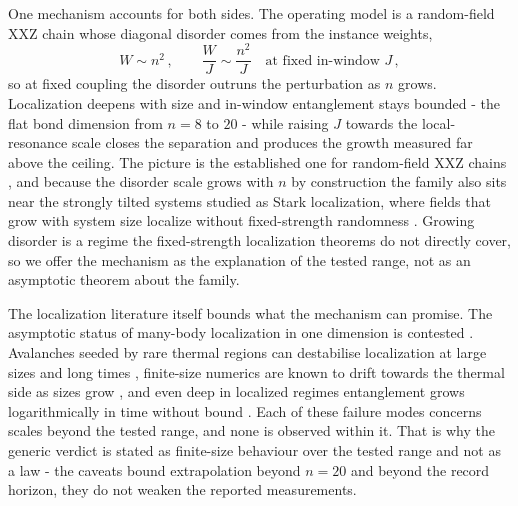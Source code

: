 One mechanism accounts for both sides. The operating model is a random-field XXZ chain whose diagonal disorder comes from the instance weights,
\begin{equation}\label{def:localization-protection}
W \sim n^{2}\,, \qquad \frac{W}{J} \sim \frac{n^{2}}{J} \quad \text{at fixed in-window } J\,,
\end{equation}
so at fixed coupling the disorder outruns the perturbation as $n$ grows. Localization deepens with size and in-window entanglement stays bounded - the flat bond dimension from $n = 8$ to $20$ - while raising $J$ towards the local-resonance scale closes the separation and produces the growth measured far above the ceiling. The picture is the established one for random-field XXZ chains \cite{znidaric2008mbl, pal2010mbl, serbyn2013liom, imbrie2016mbl}, and because the disorder scale grows with $n$ by construction the family also sits near the strongly tilted systems studied as Stark localization, where fields that grow with system size localize without fixed-strength randomness \cite{schulz2019stark, vannieuwenburg2019stark, morong2021stark}. Growing disorder is a regime the fixed-strength localization theorems do not directly cover, so we offer the mechanism as the explanation of the tested range, not as an asymptotic theorem about the family.

The localization literature itself bounds what the mechanism can promise. The asymptotic status of many-body localization in one dimension is contested \cite{nandkishore2015mbl, abanin2019mbl}. Avalanches seeded by rare thermal regions can destabilise localization at large sizes and long times \cite{deroeck2017avalanche, luitz2017thermalize}, finite-size numerics are known to drift towards the thermal side as sizes grow \cite{morningstar2022avalanches}, and even deep in localized regimes entanglement grows logarithmically in time without bound \cite{bardarson2012unbounded}. Each of these failure modes concerns scales beyond the tested range, and none is observed within it. That is why the generic verdict is stated as finite-size behaviour over the tested range and not as a law - the caveats bound extrapolation beyond $n = 20$ and beyond the record horizon, they do not weaken the reported measurements.

